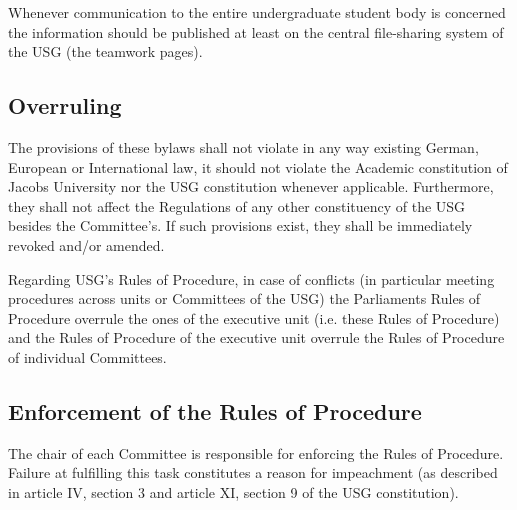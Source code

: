 Whenever communication to the entire undergraduate student body is concerned the information should be published at least on the central file-sharing system of the USG (the teamwork pages).

\subsection{Overruling}\label{provision:overruling}
The provisions of these bylaws shall not violate in any way existing German, European or International law, it should not violate the Academic constitution of Jacobs University nor the USG constitution whenever applicable. Furthermore, they shall not affect the Regulations of any other constituency of the USG besides the Committee's. If such provisions exist, they shall be immediately revoked and/or amended.

Regarding USG's Rules of Procedure, in case of conflicts (in particular meeting procedures across units or Committees of the USG) the Parliaments Rules of Procedure overrule the ones of the executive unit (i.e. these Rules of Procedure) and the Rules of Procedure of the executive unit overrule the Rules of Procedure of individual Committees. 

\subsection{Enforcement of the Rules of Procedure}
The chair of each Committee is responsible for enforcing the Rules of Procedure. Failure at fulfilling this task constitutes a reason for impeachment (as described in article IV, section 3 and article XI, section 9 of the USG constitution).